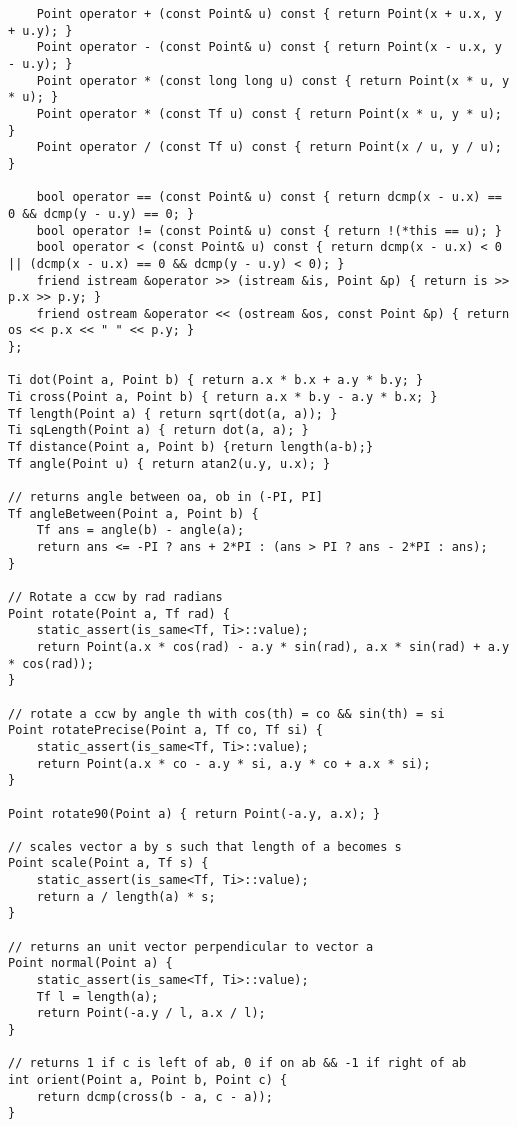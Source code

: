 \documentclass[FSZ,a4paper,onesided]{article}
\begin{document}
\begin{multicols*}{\COLS}
\begin{lstlisting}
    Point operator + (const Point& u) const { return Point(x + u.x, y + u.y); }
    Point operator - (const Point& u) const { return Point(x - u.x, y - u.y); }
    Point operator * (const long long u) const { return Point(x * u, y * u); }
    Point operator * (const Tf u) const { return Point(x * u, y * u); }
    Point operator / (const Tf u) const { return Point(x / u, y / u); }
 
    bool operator == (const Point& u) const { return dcmp(x - u.x) == 0 && dcmp(y - u.y) == 0; }
    bool operator != (const Point& u) const { return !(*this == u); }
    bool operator < (const Point& u) const { return dcmp(x - u.x) < 0 || (dcmp(x - u.x) == 0 && dcmp(y - u.y) < 0); }
    friend istream &operator >> (istream &is, Point &p) { return is >> p.x >> p.y; }
    friend ostream &operator << (ostream &os, const Point &p) { return os << p.x << " " << p.y; }
};
 
Ti dot(Point a, Point b) { return a.x * b.x + a.y * b.y; }
Ti cross(Point a, Point b) { return a.x * b.y - a.y * b.x; }
Tf length(Point a) { return sqrt(dot(a, a)); }
Ti sqLength(Point a) { return dot(a, a); }
Tf distance(Point a, Point b) {return length(a-b);}
Tf angle(Point u) { return atan2(u.y, u.x); }
 
// returns angle between oa, ob in (-PI, PI]
Tf angleBetween(Point a, Point b) {
    Tf ans = angle(b) - angle(a);
    return ans <= -PI ? ans + 2*PI : (ans > PI ? ans - 2*PI : ans);
}
 
// Rotate a ccw by rad radians
Point rotate(Point a, Tf rad) {
    static_assert(is_same<Tf, Ti>::value);
    return Point(a.x * cos(rad) - a.y * sin(rad), a.x * sin(rad) + a.y * cos(rad));
}
 
// rotate a ccw by angle th with cos(th) = co && sin(th) = si
Point rotatePrecise(Point a, Tf co, Tf si) {
    static_assert(is_same<Tf, Ti>::value);
    return Point(a.x * co - a.y * si, a.y * co + a.x * si);
}
 
Point rotate90(Point a) { return Point(-a.y, a.x); }
 
// scales vector a by s such that length of a becomes s
Point scale(Point a, Tf s) {
    static_assert(is_same<Tf, Ti>::value);
    return a / length(a) * s;
}
 
// returns an unit vector perpendicular to vector a
Point normal(Point a) {
    static_assert(is_same<Tf, Ti>::value);
    Tf l = length(a);
    return Point(-a.y / l, a.x / l);
}
 
// returns 1 if c is left of ab, 0 if on ab && -1 if right of ab
int orient(Point a, Point b, Point c) {
    return dcmp(cross(b - a, c - a));
}
 

\end{lstlisting}
\end{multicols*}
\end{document}
